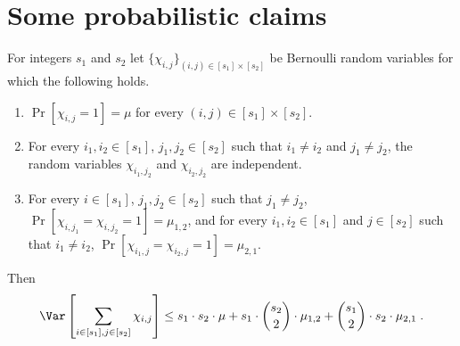 \section{Some probabilistic claims}\label{app:prob}


\begin{claim}\label{clm:var1}
For integers $s_1$ and $s_2$  let
$\{\chi_{i,j}\}_{(i,j)\in [s_1]\times [s_2]}$ be Bernoulli random variables for which the following holds.
\begin{enumerate}
\item  $\Pr[\chi_{i,j} = 1] = \mu$ for every $(i,j)\in [s_1]\times [s_2]$.
\item For every $i_1,i_2 \in [s_1]$, $j_1,j_2\in [s_2]$ such that $i_1\neq i_2$ and $j_1\neq j_2$,
the random variables $\chi_{i_1,j_2}$ and $\chi_{i_2,j_2}$ are independent.
\item For every $i\in [s_1]$, $j_1,j_2\in [s_2]$ such that  $j_1\neq j_2$,
$\Pr[\chi_{i,j_1}=\chi_{i,j_2} = 1] = \mu_{1,2}$, and for every $i_1,i_2 \in [s_1]$ and $j \in [s_2]$ such that $i_1\neq i_2$,  $\Pr[\chi_{i_1,j}=\chi_{i_2,j} = 1] = \mu_{2,1}$.
\end{enumerate}
Then
$$\Var\left[\sum_{i\in [s_1],j\in [s_2]}\chi_{i,j}\right] \leq s_1\cdot s_2 \cdot \mu + s_1\cdot {s_2\choose 2}\cdot \mu_{1,2} + {s_1\choose 2} \cdot s_2\cdot \mu_{2,1}\;.$$
\end{claim}

